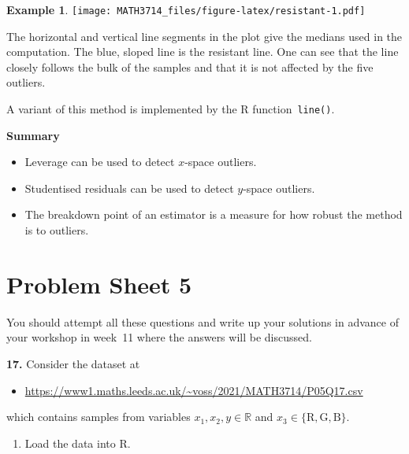 \documentclass[
  a4paper,
]{article}
\providecommand{\tightlist}{%
  \setlength{\itemsep}{0pt}\setlength{\parskip}{0pt}}
\theoremstyle{definition}
\theoremstyle{definition}
\newtheorem{example}{Example}[section]
\theoremstyle{definition}
\theoremstyle{definition}
\theoremstyle{remark}
\begin{document}
\begin{example}
\texttt{[image: MATH3714\_files/figure-latex/resistant-1.pdf]}

The horizontal and vertical line segments in the plot give the medians
used in the computation. The blue, sloped line is the resistant line.
One can see that the line closely follows the bulk of the samples
and that it is not affected by the five outliers.

A variant of this method is implemented by the R function~\texttt{line()}.
\end{example}

\textbf{Summary}

\begin{itemize}
\tightlist
\item
  Leverage can be used to detect \(x\)-space outliers.
\item
  Studentised residuals can be used to detect \(y\)-space outliers.
\item
  The breakdown point of an estimator is a measure for how robust
  the method is to outliers.
\end{itemize}

\clearpage

\hypertarget{P05}{%
\section*{Problem Sheet 5}\label{P05}}

You should attempt all these questions and write up your solutions in advance
of your workshop in week~11 where the answers will be discussed.

\textbf{17.} Consider the dataset at

\begin{itemize}
\tightlist
\item
  \url{https://www1.maths.leeds.ac.uk/~voss/2021/MATH3714/P05Q17.csv}
\end{itemize}

which contains samples from variables \(x_1, x_2, y \in \mathbb{R}\) and
\(x_3 \in \{\mathrm{R}, \mathrm{G}, \mathrm{B}\}\).

\begin{enumerate}
\def\labelenumi{\alph{enumi}.}
\tightlist
\item
  Load the data into R.
\end{enumerate}
\end{document}

